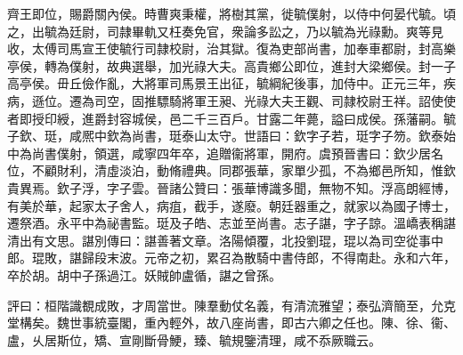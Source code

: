 \begin{pinyinscope}
齊王即位，賜爵關內侯。時曹爽秉權，將樹其黨，徙毓僕射，以侍中何晏代毓。頃之，出毓為廷尉，司隷畢軌又枉奏免官，衆論多訟之，乃以毓為光祿勳。爽等見收，太傅司馬宣王使毓行司隷校尉，治其獄。復為吏部尚書，加奉車都尉，封高樂亭侯，轉為僕射，故典選舉，加光祿大夫。高貴鄉公即位，進封大梁鄉侯。封一子高亭侯。毌丘儉作亂，大將軍司馬景王出征，毓綱紀後事，加侍中。正元三年，疾病，遜位。遷為司空，固推驃騎將軍王昶、光祿大夫王觀、司隷校尉王祥。詔使使者即授印綬，進爵封容城侯，邑二千三百戶。甘露二年薨，謚曰成侯。孫藩嗣。毓子欽、珽，咸熈中欽為尚書，珽泰山太守。世語曰：欽字子若，珽字子笏。欽泰始中為尚書僕射，領選，咸寧四年卒，追贈衞將軍，開府。虞預晉書曰：欽少居名位，不顧財利，清虛淡泊，動脩禮典。同郡張華，家單少孤，不為鄉邑所知，惟欽貴異焉。欽子浮，字子雲。晉諸公贊曰：張華博識多聞，無物不知。浮高朗經博，有美於華，起家太子舍人，病疽，截手，遂廢。朝廷器重之，就家以為國子博士，遷祭酒。永平中為祕書監。珽及子皓、志並至尚書。志子諶，字子諒。溫嶠表稱諶清出有文思。諶別傳曰：諶善著文章。洛陽傾覆，北投劉琨，琨以為司空從事中郎。琨敗，諶歸段末波。元帝之初，累召為散騎中書侍郎，不得南赴。永和六年，卒於胡。胡中子孫過江。妖賊帥盧循，諶之曾孫。

評曰：桓階識覩成敗，才周當世。陳羣動仗名義，有清流雅望；泰弘濟簡至，允克堂構矣。魏世事統臺閣，重內輕外，故八座尚書，即古六卿之任也。陳、徐、衞、盧，乆居斯位，矯、宣剛斷骨鯁，臻、毓規鑒清理，咸不忝厥職云。


\end{pinyinscope}